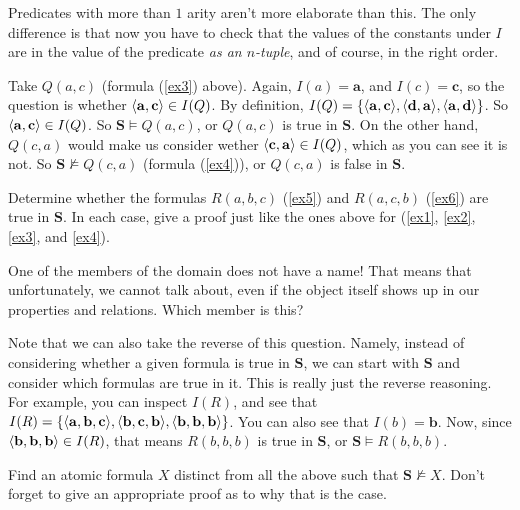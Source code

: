 Predicates with more than $1$ arity aren't more elaborate than this. The only difference is that now you have to check that the values of the constants under $I$ are in the value of the predicate \textit{as an $n$-tuple}, and of course, in the right order. 

Take $Q(a, c)$ (formula (\ref{ex3}) above). Again, $I(a)=\mathbf{a}$, and $I(c)=\mathbf{c}$, so the question is whether $\langle\mathbf{a}, \mathbf{c}\rangle \in I(Q)$. By definition, $I(Q)=\{\langle\mathbf{a}, \mathbf{c}\rangle, \langle\mathbf{d}, \mathbf{a}\rangle, \langle\mathbf{a}, \mathbf{d}\rangle\}$. So $\langle\mathbf{a}, \mathbf{c}\rangle \in I(Q)$. So $\mathbf{S} \models Q(a, c)$, or $Q(a,c)$ is true in $\mathbf{S}$. On the other hand, $Q(c, a)$ would make us consider wether $\langle\mathbf{c}, \mathbf{a}\rangle \in I(Q)$, which as you can see it is not. So $\mathbf{S}\not\models Q(c, a)$ (formula (\ref{ex4})), or $Q(c, a)$ is false in $\mathbf{S}$.

\begin{exc}
Determine whether the formulas $R(a, b, c)$ (\ref{ex5}) and $R(a, c, b)$ (\ref{ex6}) are true in $\mathbf{S}$. In each case, give a proof just like the ones above for (\ref{ex1}, \ref{ex2}, \ref{ex3}, and \ref{ex4}). 
\end{exc} 

\begin{exc}
One of the members of the domain does not have a name! That means that unfortunately, we cannot talk about, even if the object itself shows up in our properties and relations. Which member is this?
\end{exc}

Note that we can also take the reverse of this question. Namely, instead of considering whether a given formula is true in $\mathbf{S}$, we can start with $\mathbf{S}$ and consider which formulas are true in it. This is really just the reverse reasoning. For example, you can inspect $I(R)$, and see that $I(R)=\{\langle\mathbf{a}, \mathbf{b}, \mathbf{c}\rangle, \langle\mathbf{b}, \mathbf{c}, \mathbf{b}\rangle, \langle\mathbf{b}, \mathbf{b}, \mathbf{b}\rangle\}$. You can also see that $I(b)=\mathbf{b}$. Now, since $\langle\mathbf{b}, \mathbf{b}, \mathbf{b}\rangle \in I(R)$, that means $R(b, b, b)$ is true in $\mathbf{S}$, or $\mathbf{S} \models R(b, b, b)$. 

\begin{exc}
Find an atomic formula $X$ distinct from all the above such that $\mathbf{S} \not\models X$. Don't forget to give an appropriate proof as to why that is the case. 
\end{exc}

